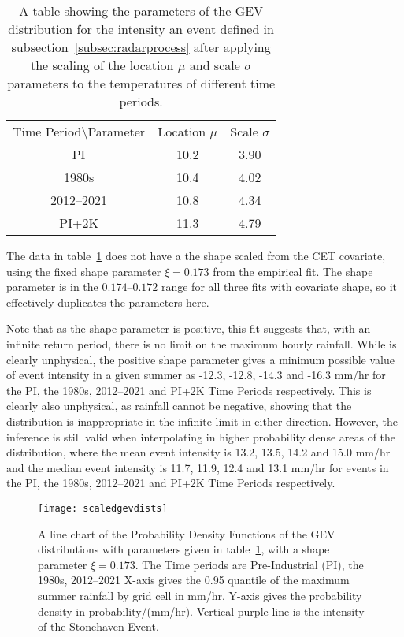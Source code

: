 \begin{table}[H]
    \centering
    \begin{tabular}{c c c}
        Time Period\textbackslash Parameter & Location $\mu$ & Scale $\sigma$ \\
        PI & 10.2 & 3.90 \\
        1980s & 10.4 & 4.02 \\
        2012--2021 & 10.8 & 4.34 \\
        PI+2K & 11.3 & 4.79
    \end{tabular}
    \caption[Parameters of the GEV distribution for the intensity an event.]{
        A table showing the parameters of the GEV distribution for the intensity an event defined in subsection~\ref{subsec:radarprocess} after
        applying the scaling of the location $\mu$ and scale $\sigma$ parameters to the temperatures of different time periods.}
    \label{tab:0.95params}
\end{table}

The data in table~\ref{tab:0.95params} does not have a the shape scaled from the CET covariate,
    using the fixed shape parameter $\xi = 0.173$ from the empirical fit.
The shape parameter is in the $0.174$--$0.172$ range for all three fits with covariate shape,
    so it effectively duplicates the parameters here.

Note that as the shape parameter is positive,
    this fit suggests that, with an infinite return period, there is no limit on the maximum hourly rainfall.
While is clearly unphysical, the positive shape parameter gives a minimum possible value of event intensity in a given summer as
    -12.3, -12.8, -14.3 and -16.3 mm/hr for the PI, the 1980s, 2012--2021 and PI+2K Time Periods respectively.
This is clearly also unphysical,
    as rainfall cannot be negative,
    showing that the distribution is inappropriate in the infinite limit in either direction.
However,
    the inference is still valid when interpolating in higher probability dense areas of the distribution,
    where the mean event intensity is 13.2, 13.5, 14.2 and 15.0 mm/hr and
    the median event intensity is 11.7, 11.9, 12.4 and 13.1 mm/hr for
    events in the PI, the 1980s, 2012--2021 and PI+2K Time Periods respectively.

\begin{figure}[H]
    \centering
    \texttt{[image: scaledgevdists]}
    \caption[PDFs of the GEV distributions.]{
        A line chart of the Probability Density Functions of the GEV distributions with parameters given in table~\ref{tab:0.95params},
        with a shape parameter $\xi = 0.173$.
    The Time periods are Pre-Industrial (PI), the 1980s, 2012--2021
    X-axis gives the 0.95 quantile of the maximum summer rainfall by grid cell in mm/hr,
        Y-axis gives the probability density in probability/(mm/hr).
    Vertical purple line is the intensity of the Stonehaven Event.}
    \label{fig:scaledgevdists}
\end{figure}

